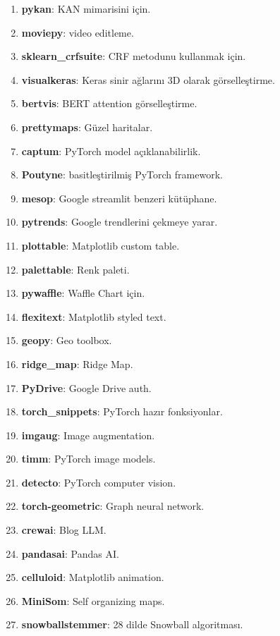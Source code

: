 \begin{enumerate}
    \item \textbf{pykan}: KAN mimarisini için.
    \item \textbf{moviepy}: video editleme.
    \item \textbf{sklearn\_crfsuite}: CRF metodunu kullanmak için.
    \item \textbf{visualkeras}: Keras sinir ağlarını 3D olarak görselleştirme.
    \item \textbf{bertvis}: BERT attention görselleştirme.
    \item \textbf{prettymaps}: Güzel haritalar.
    \item \textbf{captum}: PyTorch model açıklanabilirlik.
    \item \textbf{Poutyne}: basitleştirilmiş PyTorch framework.
    \item \textbf{mesop}: Google streamlit benzeri kütüphane.
    \item \textbf{pytrends}: Google trendlerini çekmeye yarar.
    \item \textbf{plottable}: Matplotlib custom table.
    \item \textbf{palettable}: Renk paleti.
    \item \textbf{pywaffle}: Waffle Chart için.
    \item \textbf{flexitext}: Matplotlib styled text.
    \item \textbf{geopy}: Geo toolbox.
    \item \textbf{ridge\_map}: Ridge Map.
    \item \textbf{PyDrive}: Google Drive auth.
    \item \textbf{torch\_snippets}: PyTorch hazır fonksiyonlar.
    \item \textbf{imgaug}: Image augmentation.
    \item \textbf{timm}: PyTorch image models.
    \item \textbf{detecto}: PyTorch computer vision.
    \item \textbf{torch-geometric}: Graph neural network.
    \item \textbf{crewai}: Blog LLM.
    \item \textbf{pandasai}: Pandas AI.
    \item \textbf{celluloid}: Matplotlib animation.
    \item \textbf{MiniSom}: Self organizing maps.
    \item \textbf{snowballstemmer}: 28 dilde Snowball algoritması.
\end{enumerate}


